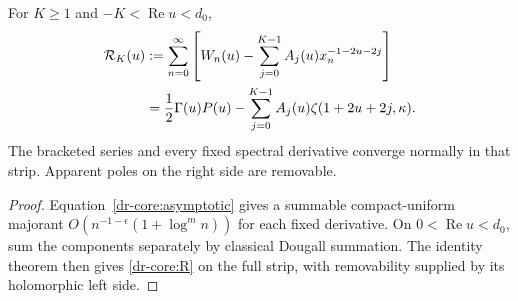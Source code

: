 \begin{proposition}
\label{dr-core:subtraction}
For $K\geq1$ and $-K<\operatorname{Re}u<d_0$,
\begin{align}
 \mathcal R_K(u)
 &:={\sum_{n=0}^{\infty}}
 \left[W_n(u)-\sum_{j=0}^{K-1}A_j(u)x_n^{-1-2u-2j}\right]\notag\\
 &=\frac12\Gamma(u)P(u)-\sum_{j=0}^{K-1}
                              A_j(u)\zeta(1+2u+2j,\kappa).
 \label{dr-core:R}
\end{align}
The bracketed series and every fixed spectral derivative converge normally
in that strip. Apparent poles on the right side are removable.
\end{proposition}
\begin{proof}
Equation~\eqref{dr-core:asymptotic} gives a summable compact-uniform
majorant $O(n^{-1-\epsilon}(1+\log^m n))$ for each fixed derivative.
On $0<\operatorname{Re}u<d_0$, sum the components separately by classical
Dougall summation. The identity theorem then gives \eqref{dr-core:R}
on the full strip, with removability supplied by its holomorphic left side.
\end{proof}

